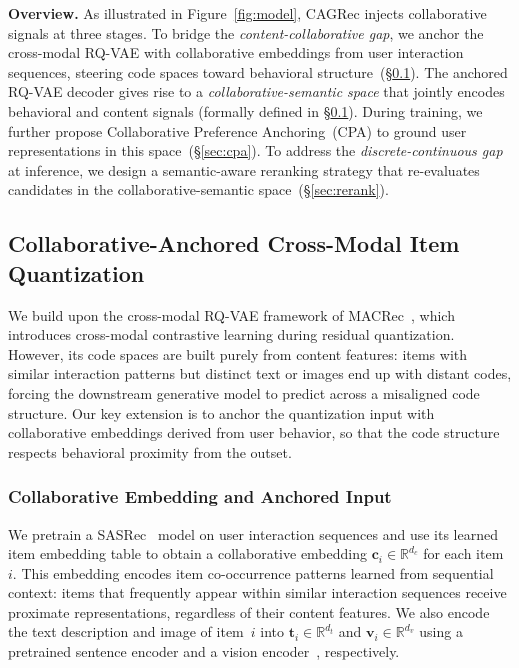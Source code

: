 \documentclass[sigconf, anonymous, review]{acmart}
\begin{document}
\noindent\textbf{Overview.}
As illustrated in Figure~\ref{fig:model}, CAGRec injects collaborative signals at three stages.
%
To bridge the \emph{content-collaborative gap}, we anchor the cross-modal RQ-VAE with collaborative embeddings from user interaction sequences, steering code spaces toward behavioral structure~(\S\ref{sec:quant}).
%
The anchored RQ-VAE decoder gives rise to a \emph{collaborative-semantic space} that jointly encodes behavioral and content signals (formally defined in \S\ref{sec:quant}).
%
During training, we further propose Collaborative Preference Anchoring~(CPA) to ground user representations in this space~(\S\ref{sec:cpa}).
%
To address the \emph{discrete-continuous gap} at inference, we design a semantic-aware reranking strategy that re-evaluates candidates in the collaborative-semantic space~(\S\ref{sec:rerank}).

\subsection{Collaborative-Anchored Cross-Modal Item Quantization}
\label{sec:quant}

We build upon the cross-modal RQ-VAE framework of MACRec~\cite{macrec}, which introduces cross-modal contrastive learning during residual quantization.
%
However, its code spaces are built purely from content features: items with similar interaction patterns but distinct text or images end up with distant codes, forcing the downstream generative model to predict across a misaligned code structure.
%
Our key extension is to anchor the quantization input with collaborative embeddings derived from user behavior, so that the code structure respects behavioral proximity from the outset.

\subsubsection{Collaborative Embedding and Anchored Input}

We pretrain a SASRec~\cite{sasrec} model on user interaction sequences and use its learned item embedding table to obtain a collaborative embedding $\mathbf{c}_i \in \mathbb{R}^{d_c}$ for each item~$i$.
% 
This embedding encodes item co-occurrence patterns learned from sequential context: items that frequently appear within similar interaction sequences receive proximate representations, regardless of their content features.
% 
We also encode the text description and image of item~$i$ into $\mathbf{t}_i \in \mathbb{R}^{d_t}$ and $\mathbf{v}_i \in \mathbb{R}^{d_v}$ using a pretrained sentence encoder and a vision encoder~\cite{clip}, respectively.
\end{document}
